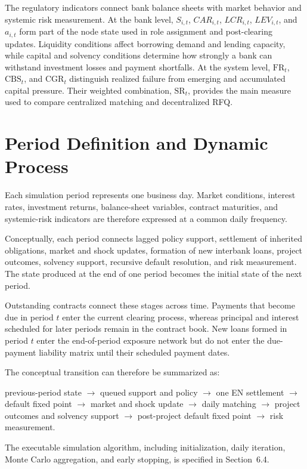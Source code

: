 The regulatory indicators connect bank balance sheets with market
behavior and systemic risk measurement. At the bank level, \(S_{i,t}\),
\({CAR}_{i,t}\), \({LCR}_{i,t}\), \({LEV}_{i,t}\), and \(a_{i,t}\) form
part of the node state used in role assignment and post-clearing
updates. Liquidity conditions affect borrowing demand and lending
capacity, while capital and solvency conditions determine how strongly a
bank can withstand investment losses and payment shortfalls. At the
system level, \(\mathrm{FR}_t\), \(\mathrm{CBS}_t\), and \(\mathrm{CGR}_t\) distinguish
realized failure from emerging and accumulated capital pressure. Their
weighted combination, \(\mathrm{SR}_t\), provides the main measure used to
compare centralized matching and decentralized RFQ.

\section{Period Definition and Dynamic Process}

Each simulation period represents one business day. Market conditions,
interest rates, investment returns, balance-sheet variables, contract
maturities, and systemic-risk indicators are therefore expressed at a
common daily frequency.

Conceptually, each period connects lagged policy support, settlement of
inherited obligations, market and shock updates, formation of new
interbank loans, project outcomes, solvency support, recursive default
resolution, and risk measurement. The state produced at the end of one
period becomes the initial state of the next period.

Outstanding contracts connect these stages across time. Payments that
become due in period \(t\) enter the current clearing process, whereas
principal and interest scheduled for later periods remain in the
contract book. New loans formed in period \(t\) enter the end-of-period
exposure network but do not enter the due-payment liability matrix until
their scheduled payment dates.

The conceptual transition can therefore be summarized as:

previous-period state \(\rightarrow\) queued support and policy
\(\rightarrow\) one EN settlement \(\rightarrow\) default fixed point
\(\rightarrow\) market and shock update \(\rightarrow\) daily matching
\(\rightarrow\) project outcomes and solvency support \(\rightarrow\)
post-project default fixed point \(\rightarrow\) risk measurement.

The executable simulation algorithm, including initialization, daily
iteration, Monte Carlo aggregation, and early stopping, is specified in
Section~6.4.
